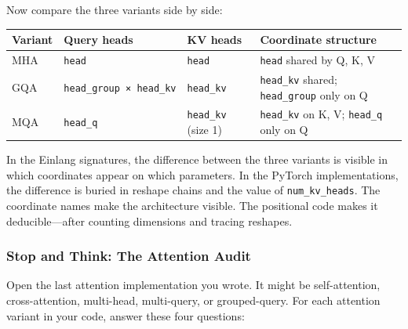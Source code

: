 \documentclass[11pt,titlepage]{article}
\begin{document}
Now compare the three variants side by side:

\begin{longtable}[]{@{}llll@{}}
\toprule
Variant & Query heads & KV heads & Coordinate structure\tabularnewline
\midrule
\endhead
MHA & \texttt{head} & \texttt{head} & \texttt{head} shared by Q, K,
V\tabularnewline
GQA & \texttt{head\_group\ ×\ head\_kv} & \texttt{head\_kv} &
\texttt{head\_kv} shared; \texttt{head\_group} only on Q\tabularnewline
MQA & \texttt{head\_q} & \texttt{head\_kv} (size 1) & \texttt{head\_kv}
on K, V; \texttt{head\_q} only on Q\tabularnewline
\bottomrule
\end{longtable}

In the Einlang signatures, the difference between the three variants is
visible in which coordinates appear on which parameters. In the PyTorch
implementations, the difference is buried in reshape chains and the
value of \texttt{num\_kv\_heads}. The coordinate names make the
architecture visible. The positional code makes it deducible---after
counting dimensions and tracing reshapes.

\vspace{2em}

\hypertarget{stop-and-think-the-attention-audit}{%
\subsubsection{Stop and Think: The Attention
Audit}\label{stop-and-think-the-attention-audit}}

Open the last attention implementation you wrote. It might be
self-attention, cross-attention, multi-head, multi-query, or
grouped-query. For each attention variant in your code, answer these
four questions:
\end{document}
